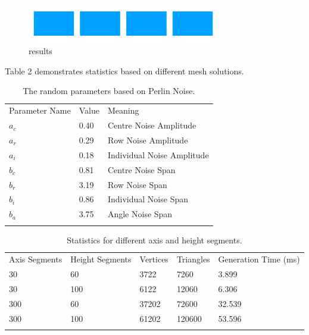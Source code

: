 \begin{figure}
  \includegraphics[width=0.75\textwidth]{t2.pdf}
\caption{results}
\label{fig:1}       %
\end{figure}

Table 2 demonstrates statistics based on different mesh solutions. 

\begin{table}
\caption{The random parameters based on Perlin Noise.}
\label{tab:1}       %
\begin{tabular}{lll}
\hline\noalign{\smallskip}
Parameter Name & Value & Meaning  \\
\noalign{\smallskip}\hline\noalign{\smallskip}
$a_{c}$ & 0.40 & Centre Noise Amplitude \\
$a_{r}$ & 0.29 & Row Noise Amplitude \\
$a_{i}$ & 0.18 & Individual Noise Amplitude \\
$b_{c}$ & 0.81 & Centre Noise Span \\
$b_{r}$ & 3.19 & Row Noise Span \\
$b_{i}$ & 0.86 & Individual Noise Span \\
$b_{a}$ & 3.75 & Angle Noise Span \\
\noalign{\smallskip}\hline
\end{tabular}
\end{table}


\begin{table}
\caption{Statistics for different axis and height segments.}
\label{tab:1}       %
\begin{tabular}{lllll}
\hline\noalign{\smallskip}
Axis Segments & Height Segments & Vertices & Triangles & Generation Time (ms)\\
\noalign{\smallskip}\hline\noalign{\smallskip}
30 & 60 & 3722 & 7260 & 3.899 \\
30 & 100 & 6122 & 12060 & 6.306 \\
300 & 60 & 37202 & 72600 & 32.539 \\
300 & 100 & 61202 & 120600 & 53.596 \\
\noalign{\smallskip}\hline
\end{tabular}
\end{table}

